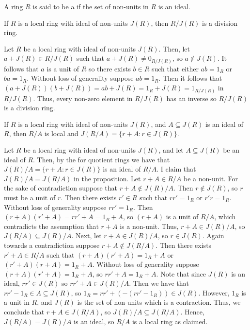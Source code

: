 \documentclass[12pt, a4paper, twoside, openright, titlepage]{book}
\begin{document}
\begin{defn}{}{}
    A ring $R$ is said to be a  if the set of non-units in $R$ is an ideal.
\end{defn}

\begin{prop}{}{}
    If $R$ is a local ring with ideal of non-units $J(R)$, then $R/J(R)$ is a division ring.
    \begin{proof*}{}{}
        Let $R$ be a local ring with ideal of non-units $J(R)$. Then, let $a+J(R) \in R/J(R)$ such that $a+J(R) \neq 0_{R/J(R)}$, so $a \notin J(R)$. It follows that $a$ is a unit of $R$ so there exists $b \in R$ such that either $ab = 1_R$ or $ba = 1_R$. Without loss of generality suppose $ab = 1_R$. Then it follows that $(a+J(R))(b+J(R)) = ab+J(R) = 1_R + J(R) = 1_{R/J(R)}$ in $R/J(R)$. Thus, every non-zero element in $R/J(R)$ has an inverse so $R/J(R)$ is a division ring.
    \end{proof*}
\end{prop}

\begin{prop}{}{}
    If $R$ is a local ring with ideal of non-units $J(R)$, and $A \subseteq J(R)$ is an ideal of $R$, then $R/A$ is local and $J(R/A) = \{r+A:r \in J(R)\}$.
    \begin{proof*}{}{}
        Let $R$ be a local ring with ideal of non-units $J(R)$, and let $A \subseteq J(R)$ be an ideal of $R$. Then, by the  for quotient rings we have that $J(R)/A = \{r + A: r \in J(R)\}$ is an ideal of $R/A$. I claim that $J(R)/A = J(R/A)$ in the proposition. Let $r+A \in R/A$ be a non-unit. For the sake of contradiction suppose that $r+A \notin J(R)/A$. Then $r \notin J(R)$, so $r$ must be a unit of $r$. Then there exists $r' \in R$ such that $rr' = 1_R$ or $r'r = 1_R$. Without loss of generality suppose $rr' = 1_R$. Then $(r+A)(r'+A) = rr'+A = 1_R+A$, so $(r+A)$ is a unit of $R/A$, which contradicts the assumption that $r+A$ is a non-unit. Thus, $r+A \in J(R)/A$, so $J(R/A) \subseteq J(R)/A$. Next, let $r + A \in J(R)/A$, so $r \in J(R)$. Again towards a contradiction suppose $r + A \notin J(R/A)$. Then there exists $r'+A \in R/A$ such that $(r+A)(r'+A) = 1_R+A$ or $(r'+A)(r+A) = 1_R +A$. Without loss of generality suppose $(r+A)(r'+A) = 1_R +A$, so $rr' + A = 1_R + A$. Note that since $J(R)$ is an ideal, $rr' \in J(R)$ so $rr' + A \in J(R)/A$. Then we have that $rr' - 1_R \in A \subseteq J(R)$, so $1_R = rr' + (-(rr' - 1_R)) \in J(R)$. However, $1_R$ is a unit in $R$, and $J(R)$ is the set of non-units which is a contraction. Thus, we conclude that $r+A \in J(R/A)$, so $J(R)/A \subseteq J(R/A)$. Hence, $J(R/A) = J(R)/A$ is an ideal, so $R/A$ is a local ring as claimed. 
    \end{proof*}
\end{prop}
\end{document}
